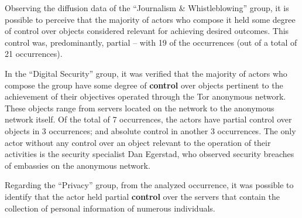 Observing the diffusion data of the ``Journalism \& Whistleblowing'' group, it is possible to perceive that the majority of actors who compose it held some degree of control over objects considered relevant for achieving desired outcomes. This control was, predominantly, partial -- with 19 of the occurrences (out of a total of 21 occurrences).

In the ``Digital Security'' group, it was verified that the majority of actors who compose the group have some degree of \textbf{control} over objects pertinent to the achievement of their objectives operated through the Tor anonymous network. These objects range from servers located on the network to the anonymous network itself. Of the total of 7 occurrences, the actors have partial control over objects in 3 occurrences; and absolute control in another 3 occurrences. The only actor without any control over an object relevant to the operation of their activities is the security specialist Dan Egerstad, who observed security breaches of embassies on the anonymous network.

Regarding the ``Privacy'' group, from the analyzed occurrence, it was possible to identify that the actor held partial \textbf{control} over the servers that contain the collection of personal information of numerous individuals.

